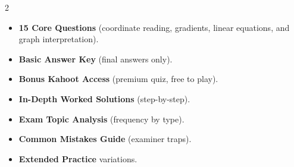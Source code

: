 \documentclass[11pt,a4paper]{article}
\newcommand{\FullReleaseDate}{April 30, 2026}
\begin{document}
\vspace{8pt}

\begin{multicols}{2}
  \begin{tcolorbox}[card, title=\sffamily\bfseries\textcolor{white}{\faHandPointDown\ TODAY (Simplified Version)}, colbacktitle=mainblue, boxed title style={sharp corners, boxrule=0pt}]
    \begin{itemize}[leftmargin=1.2em, itemsep=2pt]
      \item \small \textbf{15 Core Questions} (coordinate reading, gradients, linear equations, and graph interpretation).
      \item \small \textbf{Basic Answer Key} (final answers only).
      \item \small \textbf{Bonus Kahoot Access} (premium quiz, free to play).
    \end{itemize}
  \end{tcolorbox}

  \columnbreak

  \begin{tcolorbox}[card, title=\sffamily\bfseries\textcolor{white}{\faRocket\ ON \FullReleaseDate\ (Full Upgrade)}, colbacktitle=mainblue, boxed title style={sharp corners, boxrule=0pt}]
    \begin{itemize}[leftmargin=1.2em, itemsep=2pt]
      \item \small \textbf{In-Depth Worked Solutions} (step-by-step).
      \item \small \textbf{Exam Topic Analysis} (frequency by type).
      \item \small \textbf{Common Mistakes Guide} (examiner traps).
      \item \small \textbf{Extended Practice} variations.
    \end{itemize}
  \end{tcolorbox}
\end{multicols}
\end{document}

